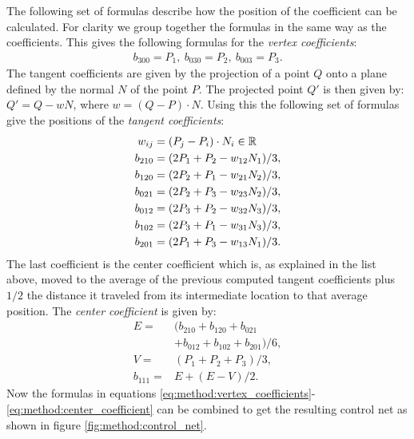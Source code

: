 %
The following set of formulas describe how the position of the coefficient can be calculated. For clarity we group together the formulas in the same way as the coefficients. This gives the following formulas for the \textit{vertex coefficients}:
\begin{align}\label{eq:method:vertex_coefficients}
	b_{300} = P_1,\ b_{030} = P_2,\ b_{003} = P_3.
\end{align}
The tangent coefficients are given by the projection of a point $Q$ onto a plane defined by the normal $N$ of the point $P$. The projected point $Q'$ is then given by: $Q' = Q - wN$, where $w = (Q - P) \cdot N$. Using this the following set of formulas give the positions of the \textit{tangent coefficients}:
\begin{align}\label{eq:method:tangent_coefficients}
	w_{ij} = {}& (P_j - P_i) \cdot N_i \in \mathbb{R} \nonumber\\
	b_{210} = {}& (2 P_1 + P_2 - w_{12}N_1) / 3,\nonumber\\
	b_{120} = {}& (2 P_2 + P_1 - w_{21}N_2) / 3,\nonumber\\
	b_{021} = {}& (2 P_2 + P_3 - w_{23}N_2) / 3, \\
	b_{012} = {}& (2 P_3 + P_2 - w_{32}N_3) / 3,\nonumber\\
	b_{102} = {}& (2 P_3 + P_1 - w_{31}N_3) / 3,\nonumber\\
	b_{201} = {}& (2 P_1 + P_3 - w_{13}N_1) / 3. \nonumber
\end{align}
The last coefficient is the center coefficient which is, as explained in the list above, moved to the average of the previous computed tangent coefficients plus $1/2$ the distance it traveled from its intermediate location to that average position.  The \textit{center coefficient} is given by:
\begin{align}\label{eq:method:center_coefficient}
	E = {}& (b_{210} + b_{120} + b_{021} \nonumber \\
		{}& + b_{012} + b_{102} + b_{201}) / 6, \nonumber\\
	V = {}& (P_1 + P_2 + P_3) / 3, \\
	b_{111} = {}& E + (E - V) / 2. \nonumber
\end{align}
Now the formulas in equations \ref{eq:method:vertex_coefficients}-\ref{eq:method:center_coefficient} can be combined to get the resulting control net as shown in figure \ref{fig:method:control_net}.

